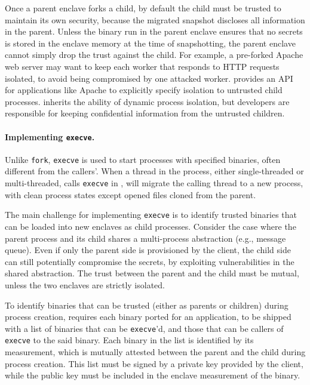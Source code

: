 Once a parent enclave forks a child, by default the child must be trusted
to maintain its own security,
because the migrated snapshot discloses all information in the parent.
Unless the binary run in the parent enclave ensures
that no secrets is stored in the enclave memory at the time of snapshotting,
the parent enclave cannot simply drop the trust against the child.
For example, a pre-forked Apache web server may want to keep each worker
that responds to HTTP requests isolated,
to avoid being compromised by one attacked worker.
\graphene{} \libos{} provides an API for applications like Apache to explicitly
specify isolation to untrusted child processes.
\sysname{} inherits the ability of dynamic process isolation,
but developers are responsible for keeping confidential information
from the untrusted children.

\paragraph{Implementing {\tt execve}.}
Unlike {\tt fork}, {\tt execve} is used to
start processes with specified binaries, often different from the callers'.
When a thread in the process, either single-threaded or multi-threaded,
calls {\tt execve} in \sysname{},
\libos{} will migrate the calling thread to a new process,
with clean process states except opened files cloned from the parent.

The main challenge for implementing {\tt execve} is to
identify trusted binaries that can be loaded into new enclaves as child processes.
Consider the case where the parent process and its child shares
a multi-process abstraction (e.g., message queue).
Even if only the parent side is provisioned by the client, the child side
can still potentially compromise the secrets,
by exploiting vulnerabilities in the shared abstraction.
The trust between the parent and the child must be mutual,
unless the two enclaves are strictly isolated.

To identify binaries that can be trusted (either as parents or children)
during process creation,
\sysname{} requires each binary ported for an application,
to be shipped with a list of binaries that can be {\tt execve}'d,
and those that can be callers of {\tt execve} to the said binary.
Each binary in the list is identified by its measurement, which is mutually attested
between the parent and the child during process creation.
This list must be signed by a private key provided by the client,
while the public key must be included in the enclave measurement of the binary.

